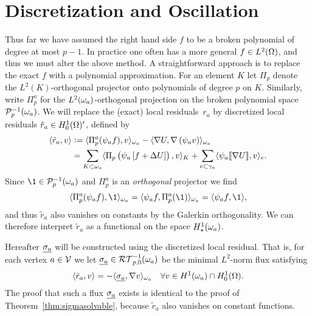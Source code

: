 \documentclass[thesis.tex]{subfiles}
\begin{document}
\section{Discretization and Oscillation}
\label{sec:oscillation}
Thus far we have assumed the right hand side $f$ to be a broken polynomial of degree at most $p-1$. In practice one 
often has a more general $f \in L^2(\Omega)$, and thus we must alter the above method.
A straightforward approach is to replace the exact $f$ with a polynomial approximation. 
For an  element $K$ let  $\Pi_p$ denote the $L^2(K)$-orthogonal projector onto polynomials of degree $p$ on $K$.
Similarly, write $\Pi_p^a$ for the $L^2(\omega_a)$-orthogonal projection on the broken polynomial space $\mathcal{P}_p^{-1}(\omega_a)$.
We will replace the (exact) local residuals~$r_a$ by discretized local residuals  $\tilde r_a  \in H_0^1(\Omega)'$,  defined by 
\begin{align*}
  \langle \tilde r_a, v \rangle &:= \langle \Pi_p^a(\psi_af),v \rangle_{\omega_a} - \langle \nabla U, \nabla \left(\psi_a v\right) \rangle_{\omega_a} \\
   &= \sum_{K \subset \omega_a} \langle \Pi_p \left(\psi_a \left[f + \Delta U\right]\right), v \rangle_K 
  +\sum_{e \subset \gamma_a} \langle \psi_a \llbracket \nabla U\rrbracket, v \rangle_e.
\end{align*}
Since $\1 \in \P_p^{-1}(\w_a)$ and $\Pi_p^a$ is an \emph{orthogonal} projector we find 
\[
  \ip{\Pi_p^a(\psi_a f), \1}_{\w_a} = \ip{\psi_a f, \Pi_p^a(\1)}_{\w_a} = \ip{\psi_a f, \1},
\]
and thus $\tilde r_a$ also vanishes on constants by the Galerkin orthogonality. We can therefore interpret
$\tilde r_a$ as a functional on the space  $H_\star^1(\omega_a)$.

Hereafter $\underline{\sigma_a}$ will be constructed using the discretized local residual. That is, 
for each vertex $a \in \mathcal{V}$ we let  $\underline{\sigma_a}\in\mathcal{RT}_{p,0}^{-1}(\omega_a)$ be the minimal $L^2$-norm
flux satisfying
\begin{equation}
  \label{eq:sigmadefdisc}
  \langle \tilde r_a, v \rangle = - \langle \underline{\sigma_a}, \nabla v \rangle_{\omega_a} \quad \forall v \in H^1(\omega_a) \cap H_0^1(\Omega).
\end{equation}
The proof that such a flux $\underline{\sigma_a}$ exists is identical to the proof
of Theorem~\ref{thm:sigmasolvable}, because $\tilde r_a$ also vanishes on constant functions.
\end{document}
